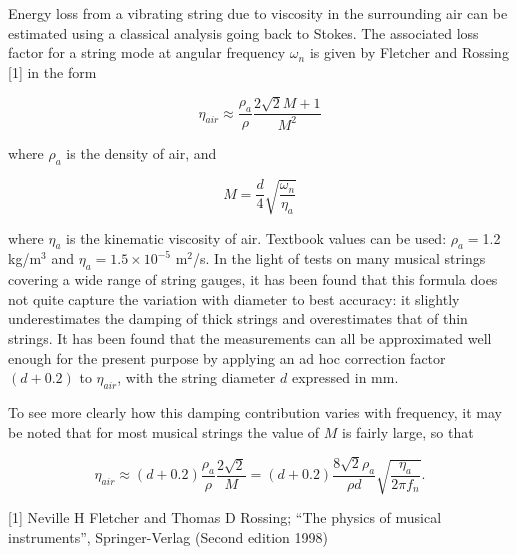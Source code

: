   Energy loss from a vibrating string due to viscosity in the surrounding air 
  can be estimated using a classical analysis going back to Stokes. The 
  associated loss factor for a string mode at angular frequency $\omega_n$ is 
  given by Fletcher and Rossing [1] in the form 

  $$\eta_{air} \approx \dfrac{\rho_a}{\rho} \dfrac{2 \sqrt{2} M+1}{M^2} 
  \tag{1}$$ 

  where $\rho_a$ is the density of air, and 

  $$M=\dfrac{d}{4} \sqrt{\dfrac{\omega_n}{\eta_a}} \tag{2}$$ 

  where $\eta_a$ is the kinematic viscosity of air. Textbook values can be 
  used: $\rho_a = $1.2 kg/m$^3$ and $\eta_a = 1.5\times 10^{-5}$ m$^2$/s. In 
  the light of tests on many musical strings covering a wide range of string 
  gauges, it has been found that this formula does not quite capture the 
  variation with diameter to best accuracy: it slightly underestimates the 
  damping of thick strings and overestimates that of thin strings. It has been 
  found that the measurements can all be approximated well enough for the 
  present purpose by applying an ad hoc correction factor $(d+0.2)$ to 
  $\eta_{air}$, with the string diameter $d$ expressed in mm. 

  To see more clearly how this damping contribution varies with frequency, it 
  may be noted that for most musical strings the value of $M$ is fairly large, 
  so that 

  $$\eta_{air} \approx (d+0.2) \dfrac{\rho_a}{\rho} \dfrac{2 \sqrt{2}}{M} = 
  (d+0.2) \dfrac{8 \sqrt{2} \rho_a}{\rho d} \sqrt{\dfrac{\eta_a}{2 \pi f_n}} . 
  \tag{3}$$ 

  \sectionreferences{}[1] Neville H Fletcher and Thomas D Rossing; ``The 
  physics of musical instruments'', Springer-Verlag (Second edition 1998) 